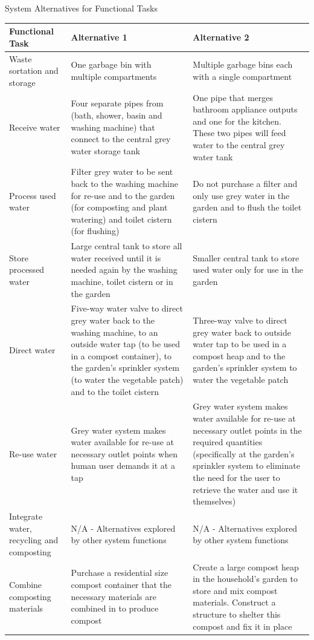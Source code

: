 \documentclass[a4paper,11pt,fleqn]{report}
\begin{document}
\begin{center}
\caption {System Alternatives for Functional Tasks} \label{tb: FunctionalTasks} 
\begin{longtable}{p{3.5cm}|p{5.5cm}|p{5.5cm}}\toprule
	{\textbf{Functional Task}} & {\textbf{Alternative 1}} & {\textbf{Alternative 2}}\\ \midrule
    Waste sortation and storage & One garbage bin with multiple compartments & Multiple garbage bins each with a single compartment\\
    \hline
    Receive water & Four separate pipes from (bath, shower, basin and washing machine) that connect to the central grey water storage tank & One pipe that merges bathroom appliance outputs and one for the kitchen. These two pipes will feed water to the central grey water tank\\
    \hline
    Process used water & Filter grey water to be sent back to the washing machine for re-use and to the garden (for composting and plant watering) and toilet cistern (for flushing) & Do not purchase a filter and only use grey water in the garden and to flush the toilet cistern\\
    \hline
    Store processed water & Large central tank to store all water received until it is needed again by the washing machine, toilet cistern or in the garden & Smaller central tank to store used water only for use in the garden\\
    \hline
    Direct water & Five-way water valve to direct grey water back to the washing machine, to an outside water tap (to be used in a compost container), to the garden's sprinkler system (to water the vegetable patch) and to the toilet cistern & Three-way valve to direct grey water back to outside water tap to be used in a compost heap and to the garden's sprinkler system to water the vegetable patch\\
    \hline
    Re-use water & Grey water system makes water available for re-use at necessary outlet points when human user demands it at a tap & Grey water system makes water available for re-use at necessary outlet points in the required quantities (specifically at the garden's sprinkler system to eliminate the need for the user to retrieve the water and use it themselves)\\
    \hline
    Integrate water, recycling and composting & N/A - Alternatives explored by other system functions & N/A - Alternatives explored by other system functions\\
    \hline
     Combine composting materials & Purchase a residential size compost container that the necessary materials are combined in to produce compost & Create a large compost heap in the household's garden to store and mix compost materials. Construct a structure to shelter this compost and fix it in place\\

\end{longtable}
\end{center}
\end{document}
